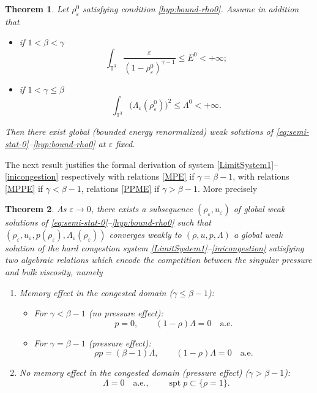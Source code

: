 \documentclass[10pt]{amsart}
\newcommand{\<}{\bigl\langle}
\renewcommand{\>}{\bigr\rangle}
\DeclareMathOperator{\spt}{spt}
\newtheorem{thm}{Theorem}[section]
\theoremstyle{definition}
\theoremstyle{remark}
\newcommand{\TT}{\mathbb{T}^3}
\let\ep\varepsilon
\begin{document}
\pagebreak[2]
\begin{thm}{\label{thm-ep}}
Let $\rho_\ep^0$ satisfying condition \eqref{hyp:bound-rho0}.
Assume in addition that
\begin{itemize}
\item if $1< \beta< \gamma$
\begin{equation}\label{hyp:energy-t0-C1}
\int_{\TT}{\dfrac{\ep}{(1-\rho^0_\ep)^{\gamma-1}}}\leq E^0 <+\infty;
\end{equation}
\item if $1 < \gamma \leq \beta$
\begin{equation}\label{hyp:energy-t0-C2}
\int_{\TT}{\big(\Lambda_\ep(\rho_\ep^0)\big)^2}
\leq \Lambda^0 < +\infty.
\end{equation}
\end{itemize} 
Then there exist global (bounded energy renormalized) weak solutions of
\eqref{eq:semi-stat-0}--\eqref{hyp:bound-rho0}
at $\ep$ fixed.
\end{thm}

The next result justifies the formal derivation of system \eqref{LimitSystem1}--\eqref{inicongestion} respectively with relations \eqref{MPE} if $\gamma= \beta-1$,
with relations \eqref{MPPE} if $\gamma<\beta-1$, relations
\eqref{PPME} if $\gamma>\beta-1$.
More precisely


\begin{thm}{\label{thm-limit}} As $\ep \rightarrow 0$, there exists a subsequence $(\rho_\ep,u_\ep)$ of global weak solutions of \eqref{eq:semi-stat-0}--\eqref{hyp:bound-rho0} such that $(\rho_\varepsilon, u_\varepsilon, p(\rho_\varepsilon), \Lambda_\varepsilon(\rho_\varepsilon))$ converges weakly to $(\rho,u, p, \Lambda)$ a global weak solution of the hard congestion system \eqref{LimitSystem1}--\eqref{inicongestion} satisfying two algebraic relations which encode the competition between the singular pressure and bulk viscosity, namely
\begin{enumerate}\renewcommand{\theenumi}{\Roman{enumi}}
\item
Memory effect in the congested domain {\rm ($\gamma \le \beta -1$)}:
\begin{itemize}
\item For $\gamma < \beta - 1$ {\rm (no pressure effect)}:
$$p=0, \qquad (1-\rho)\Lambda = 0 \quad \text{a.e.}$$ 
\item For $\gamma= \beta - 1$ {\rm (pressure effect)}:
$$\rho p= (\beta-1) \Lambda, \qquad (1-\rho)\Lambda = 0 \quad \text{a.e.}$$
\end{itemize} 

\item
No memory effect in the congested domain {\rm (pressure effect)}
{\rm ($\gamma > \beta -1$)}:
$$\Lambda= 0 \quad \text{a.e.}, \qquad \spt p \subset \{\rho =1\}.$$ 
\end{enumerate}
\end{thm}
\end{document}
